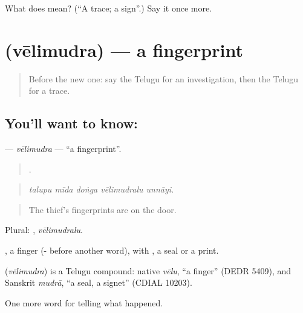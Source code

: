 \begin{tcolorbox}[breakable,colback=teal!4,colframe=teal!35!black,title={Before you move on}]
What does  mean? (\textquotedblleft{}A trace; a sign\textquotedblright{}.) Say it once more.
\end{tcolorbox}
\section[\texorpdfstring{\te{వేలిముద్ర} (vēlimudra)}{వేలిముద్ర (vēlimudra)}]{ (vēlimudra) — a fingerprint}

\label{lesson:TE-C333-velimudra}



\begin{quote}
Before the new one: say the Telugu for an investigation, then the Telugu for a trace.
\end{quote}

\subsection*{You'll want to know: }
\textbf{} — \emph{vēlimudra} — \textquotedblleft{}a fingerprint\textquotedblright{}.

\begin{quote}
    .
\end{quote}

\begin{quote}
\emph{talupu mīda doṅga vēlimudralu unnāyi.}
\end{quote}

\begin{quote}
The thief's fingerprints are on the door.
\end{quote}

Plural: , \emph{vēlimudralu}.

, a finger (- before another word), with , a seal or a print.

\begin{cousinweb}
\textbf{} (\emph{vēlimudra}) is a Telugu compound: native \emph{vēlu}, \textquotedblleft{}a finger\textquotedblright{} (DEDR 5409), and Sanskrit \emph{mudrā}, \textquotedblleft{}a seal, a signet\textquotedblright{} (CDIAL 10203).
\end{cousinweb}

\begin{grammarlens}[title={What you've built}]
One more word for telling what happened.
\end{grammarlens}

